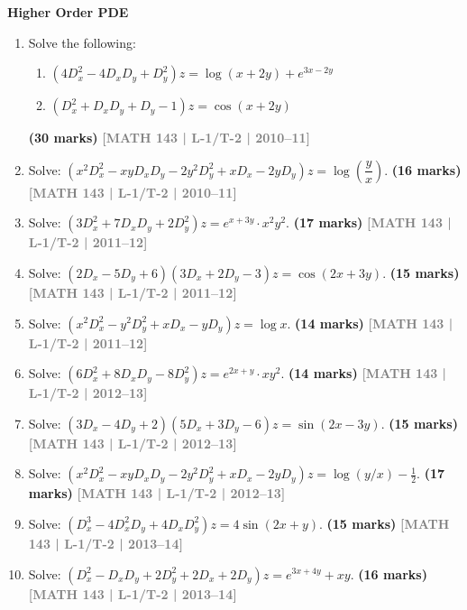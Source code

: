 \documentclass[12pt,a4paper]{article}
\newcommand{\yr}[1]{\hfill\textcolor{gray}{\small\textbf{[#1]}}}
\newcommand{\mk}[1]{\textcolor{orange!70!black}{\small\textbf{(#1 marks)}}}
\newcommand{\subtopic}[2]{%
  \vspace{10pt}
  \noindent\begin{tcolorbox}[colback=#1!8,colframe=#1,boxrule=0.6pt,arc=4pt,
    left=6pt,right=6pt,top=4pt,bottom=4pt]
    \small\bfseries\textcolor{#1}{#2}
  \end{tcolorbox}
  \vspace{2pt}
}
\begin{document}
\subtopic{cF}{Higher Order PDE}
\label{sub:s6-higher}

\begin{enumerate}

\item Solve the following:
\begin{enumerate}
  \item $(4D_{x}^{2}-4D_{x}D_{y}+D_{y}^{2})z=\log(x+2y)+e^{3x-2y}$
  \item $(D_{x}^{2}+D_{x}D_{y}+D_{y}-1)z=\cos(x+2y)$
\end{enumerate}
\mk{30} \yr{MATH 143 | L-1/T-2 | 2010--11}

\item Solve: $(x^{2}D_{x}^{2}-xyD_{x}D_{y}-2y^{2}D_{y}^{2}+xD_{x}-2yD_{y})z=\log\!\left(\dfrac{y}{x}\right)$.
\mk{16\textonehalf} \yr{MATH 143 | L-1/T-2 | 2010--11}

\item Solve: $(3D_{x}^{2}+7D_{x}D_{y}+2D_{y}^{2})z=e^{x+3y}\cdot x^{2}y^{2}$.
\mk{17\textonehalf} \yr{MATH 143 | L-1/T-2 | 2011--12}

\item Solve: $(2D_{x}-5D_{y}+6)(3D_{x}+2D_{y}-3)z=\cos(2x+3y)$.
\mk{15} \yr{MATH 143 | L-1/T-2 | 2011--12}

\item Solve: $(x^{2}D_{x}^{2}-y^{2}D_{y}^{2}+xD_{x}-yD_{y})z=\log x$.
\mk{14} \yr{MATH 143 | L-1/T-2 | 2011--12}

\item Solve: $(6D_{x}^{2}+8D_{x}D_{y}-8D_{y}^{2})z=e^{2x+y}\cdot xy^{2}$.
\mk{14} \yr{MATH 143 | L-1/T-2 | 2012--13}

\item Solve: $(3D_{x}-4D_{y}+2)(5D_{x}+3D_{y}-6)z=\sin(2x-3y)$.
\mk{15} \yr{MATH 143 | L-1/T-2 | 2012--13}

\item Solve: $(x^{2}D_{x}^{2}-xyD_{x}D_{y}-2y^{2}D_{y}^{2}+xD_{x}-2yD_{y})z=\log(y/x)-\tfrac{1}{2}$.
\mk{17\textonehalf} \yr{MATH 143 | L-1/T-2 | 2012--13}

\item Solve: $(D_{x}^{3}-4D_{x}^{2}D_{y}+4D_{x}D_{y}^{2})z=4\sin(2x+y)$.
\mk{15} \yr{MATH 143 | L-1/T-2 | 2013--14}

\item Solve: $(D_{x}^{2}-D_{x}D_{y}+2D_{y}^{2}+2D_{x}+2D_{y})z=e^{3x+4y}+xy$.
\mk{16\textonehalf} \yr{MATH 143 | L-1/T-2 | 2013--14}


\end{enumerate}
\end{document}
